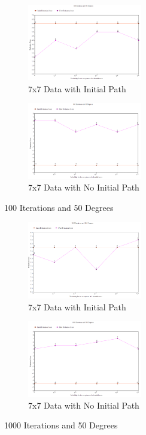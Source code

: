 \documentclass[11pt, oneside]{article}   	%
\begin{document}
\begin{figure}[H]
\centering
\begin{subfigure}{.5\textwidth}
	\centering
	\includegraphics[width=50mm]{7x7lowIlowT.png}
	\caption{7x7 Data with Initial Path}
	\label{fig:method}
\end{subfigure}%
\begin{subfigure}{.5\textwidth}
	\centering
	\includegraphics[width=50mm]{7x7lowIlowTPath.png}
	\caption{7x7 Data with No Initial Path}
	\label{fig:method}
\end{subfigure}
\caption{100 Iterations and 50 Degrees}
\end{figure}

\begin{figure}[H]
\centering
\begin{subfigure}{.5\textwidth}
	\centering
	\includegraphics[width=50mm]{7x7highIhighT.png}
	\caption{7x7 Data with Initial Path}
	\label{fig:method}
\end{subfigure}%
\begin{subfigure}{.5\textwidth}
	\centering
	\includegraphics[width=50mm]{7x7highIhighTPath.png}
	\caption{7x7 Data with No Initial Path}
	\label{fig:method}
\end{subfigure}
\caption{1000 Iterations and 50 Degrees}
\end{figure}
\end{document}
